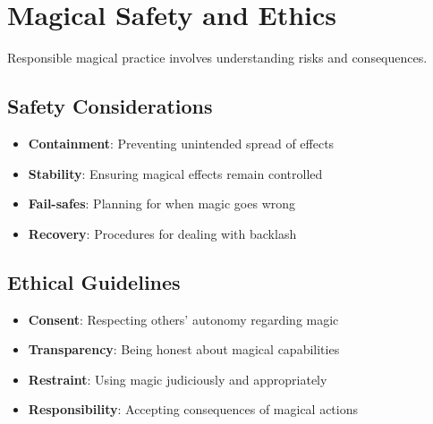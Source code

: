 \section{Magical Safety and Ethics}  

Responsible magical practice involves understanding risks and consequences.

\subsection*{Safety Considerations}
\begin{itemize}
\item \textbf{Containment}: Preventing unintended spread of effects
\item \textbf{Stability}: Ensuring magical effects remain controlled
\item \textbf{Fail-safes}: Planning for when magic goes wrong
\item \textbf{Recovery}: Procedures for dealing with backlash
\end{itemize}

\subsection*{Ethical Guidelines}
\begin{itemize}
\item \textbf{Consent}: Respecting others' autonomy regarding magic
\item \textbf{Transparency}: Being honest about magical capabilities
\item \textbf{Restraint}: Using magic judiciously and appropriately
\item \textbf{Responsibility}: Accepting consequences of magical actions
\end{itemize}


